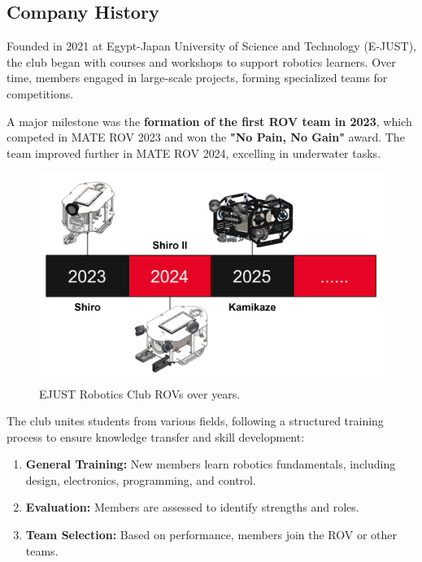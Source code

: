 \subsection{Company History}

Founded in 2021 at Egypt-Japan University of Science and Technology (E-JUST), the club began with courses and workshops to support robotics learners. Over time, members engaged in large-scale projects, forming specialized teams for competitions.

\hspace{10pt} A major milestone was the \textbf{formation of the first ROV team in 2023}, which competed in MATE ROV 2023 and won the \textbf{"No Pain, No Gain"} award. The team improved further in MATE ROV 2024, excelling in underwater tasks.

\begin{figure}[h]
    \centering
    \includegraphics[width=\columnwidth]{Sections/5Logistics/images/ROVs over the years (1).png}
    \caption{EJUST Robotics Club ROVs over years.}
    \label{fig:over_years}
\end{figure}

\hspace{10pt} The club unites students from various fields, following a structured training process to ensure knowledge transfer and skill development:
\vspace{-0.5\baselineskip}
\begin{enumerate}[leftmargin=0pt, itemindent=20pt]
    \setlength{\itemsep}{0pt}
    \item \textbf{General Training:} New members learn robotics fundamentals, including design, electronics, programming, and control.
    \item \textbf{Evaluation:} Members are assessed to identify strengths and roles.
    \item \textbf{Team Selection:} Based on performance, members join the ROV or other teams.
\end{enumerate}

